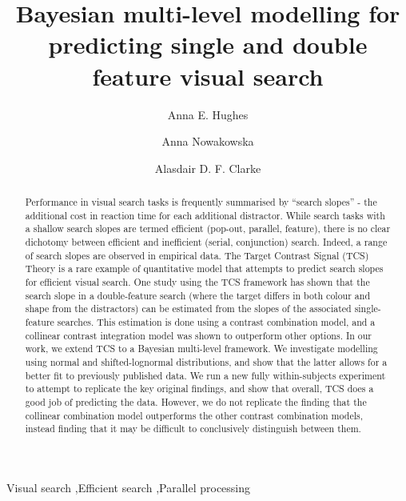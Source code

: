 \documentclass[preprint,12pt,authoryear]{elsarticle}
\begin{document}
\begin{frontmatter}


\title{Bayesian multi-level modelling for predicting single and double feature visual search}

\author[inst1]{Anna E. Hughes}
\author[2]{Anna Nowakowska}
\author[1]{Alasdair D. F. Clarke}

\address[inst1]{Department of Psychology,%
            University of Essex, 
            Colchester,
            CO4 3SQ,
            UK}

\address[2]{School of Psychology,%
            University of Aberdeen, 
            Aberdeen,
            AB24 3FX,            
            UK}

\begin{abstract}
Performance in visual search tasks is frequently summarised by ``search slopes'' - the additional cost in reaction time for each additional distractor. While search tasks with a shallow search slopes are termed efficient (pop-out, parallel, feature), there is no clear dichotomy between efficient and inefficient (serial, conjunction) search. Indeed, a range of search slopes are observed in empirical data. The Target Contrast Signal (TCS) Theory is a rare example of quantitative model that attempts to predict search slopes for efficient visual search. One study using the TCS framework has shown that the search slope in a double-feature search (where the target differs in both colour and shape from the distractors) can be estimated from the slopes of the associated single-feature searches. This estimation is done using a contrast combination model, and a collinear contrast integration model was shown to outperform other options. In our work, we extend TCS to a Bayesian multi-level framework. We investigate modelling using normal and shifted-lognormal distributions, and show that the latter allows for a better fit to previously published data. We run a new fully within-subjects experiment to attempt to replicate the key original findings, and show that overall, TCS does a good job of predicting the data. However, we do not replicate the finding that the collinear combination model outperforms the other contrast combination models, instead finding that it may be difficult to conclusively distinguish between them.
\end{abstract}


\begin{keyword}
Visual search \sep  Efficient search \sep Parallel processing
\end{keyword}

\end{frontmatter}
\end{document}
